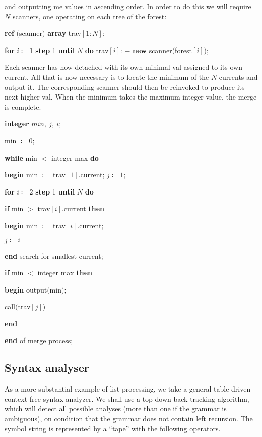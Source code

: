 \noindent
and outputting me values in ascending order. In order to do this we will require $N$ scanners, one operating on each tree of the forest:

\quad \textbf{ref} $($scanner$)$ \textbf{array} trav$[1: N]$;

\quad \textbf{for} $i\coloneq 1$ \textbf{step} 1 \textbf{until} $N$ \textbf{do} trav$[i]$: $-$ \textbf{new} scanner$($forest$[i]);$

\noindent
Each scanner has now detached with its own minimal val assigned to its own current. All that is now necessary is to locate the minimum of the $N$ currents and output it. The corresponding scanner should then be reinvoked to produce its next higher val. When the minimum takes the maximum integer value, the merge is complete.

\quad \textbf{integer} $min,\ j,\ i$;

\quad min $\coloneq 0$;

\quad \textbf{while} min $<$ integer max \textbf{do}

\quad \quad \textbf{begin} min $\coloneq$ trav$[1]$.current; $j\coloneq 1$;

\quad \quad \quad \textbf{for} $i\coloneq 2$ \textbf{step} 1 \textbf{until} $N$ \textbf{do}

\quad \quad \quad \quad \textbf{if} min $>$ trav$[i]$.current \textbf{then}

\quad \quad \quad \quad \quad \textbf{begin} min $\coloneq$ trav$[i]$.current;

\quad \quad \quad \quad \quad \quad $j\coloneq i$

\quad \quad \quad \quad \quad \textbf{end} search for smallest current;

\quad \quad \quad \textbf{if} min $<$ integer max \textbf{then}

\quad \quad \quad \quad \textbf{begin} output$($min$)$;

\quad \quad \quad \quad \quad call$($trav$[j])$

\quad \quad \quad \quad \textbf{end}

\quad \quad \textbf{end} of merge process;

\subsection{Syntax analyser}

As a more substantial example of list processing, we take a general table-driven context-free syntax analyzer. We shall use a top-down back-tracking algorithm, which will detect all possible analyses (more than one if the grammar is ambiguous), on condition that the grammar does not contain left recursion. The symbol string is represented by a ``tape'' with the following operators.

